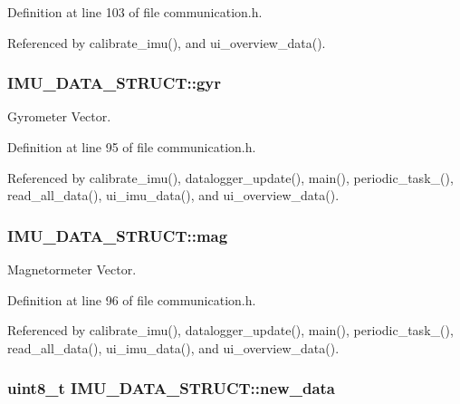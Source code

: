 Definition at line 103 of file communication.\-h.



Referenced by calibrate\-\_\-imu(), and ui\-\_\-overview\-\_\-data().

\hypertarget{structIMU__DATA__STRUCT_a0c1ac26626e4434a2ee124a1928a23a1}{
\subsubsection[{gyr}]{ I\-M\-U\-\_\-\-D\-A\-T\-A\-\_\-\-S\-T\-R\-U\-C\-T\-::gyr}}\label{structIMU__DATA__STRUCT_a0c1ac26626e4434a2ee124a1928a23a1}


Gyrometer Vector. 



Definition at line 95 of file communication.\-h.



Referenced by calibrate\-\_\-imu(), datalogger\-\_\-update(), main(), periodic\-\_\-task\-\_(), read\-\_\-all\-\_\-data(), ui\-\_\-imu\-\_\-data(), and ui\-\_\-overview\-\_\-data().

\hypertarget{structIMU__DATA__STRUCT_a40c7df8b6d49297aa52873cfd9b60daa}{
\subsubsection[{mag}]{ I\-M\-U\-\_\-\-D\-A\-T\-A\-\_\-\-S\-T\-R\-U\-C\-T\-::mag}}\label{structIMU__DATA__STRUCT_a40c7df8b6d49297aa52873cfd9b60daa}


Magnetormeter Vector. 



Definition at line 96 of file communication.\-h.



Referenced by calibrate\-\_\-imu(), datalogger\-\_\-update(), main(), periodic\-\_\-task\-\_(), read\-\_\-all\-\_\-data(), ui\-\_\-imu\-\_\-data(), and ui\-\_\-overview\-\_\-data().

\hypertarget{structIMU__DATA__STRUCT_a99924252176326418863e511d4fa437b}{
\subsubsection[{new\-\_\-data}]{\setlength{\rightskip}{0pt plus 5cm}uint8\-\_\-t I\-M\-U\-\_\-\-D\-A\-T\-A\-\_\-\-S\-T\-R\-U\-C\-T\-::new\-\_\-data}}\label{structIMU__DATA__STRUCT_a99924252176326418863e511d4fa437b}


